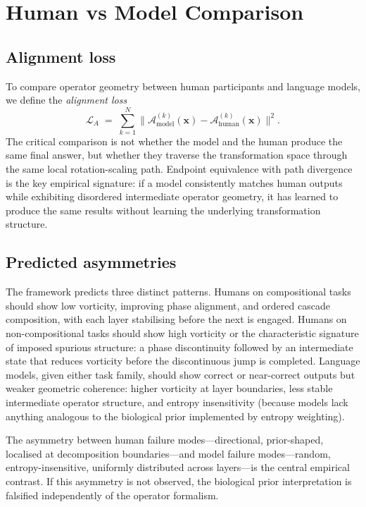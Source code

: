 \documentclass[12pt, a4paper]{article}
\theoremstyle{remark}
\theoremstyle{definition}
\newcommand{\A}{\mathcal{A}}
\begin{document}
\section{Human vs Model Comparison}
\label{sec:comparison}

\subsection{Alignment loss}

To compare operator geometry between human participants and language models, we define the
\emph{alignment loss}
\begin{equation}
  \mathcal{L}_A \;=\; \sum_{k=1}^{N}
  \bigl\|\A^{(k)}_{\text{model}}(\mathbf{x}) -
         \A^{(k)}_{\text{human}}(\mathbf{x})\bigr\|^2.
  \label{eq:alignloss}
\end{equation}
The critical comparison is not whether the model and the human produce the same final
answer, but whether they traverse the transformation space through the same local
rotation-scaling path.  Endpoint equivalence with path divergence is the key empirical
signature: if a model consistently matches human outputs while exhibiting disordered
intermediate operator geometry, it has learned to produce the same results without learning
the underlying transformation structure.

\subsection{Predicted asymmetries}

The framework predicts three distinct patterns.  Humans on compositional tasks should show
low vorticity, improving phase alignment, and ordered cascade composition, with each layer
stabilising before the next is engaged.  Humans on non-compositional tasks should show
high vorticity or the characteristic signature of imposed spurious structure: a phase
discontinuity followed by an intermediate state that reduces vorticity before the
discontinuous jump is completed.  Language models, given either task family, should show
correct or near-correct outputs but weaker geometric coherence: higher vorticity at layer
boundaries, less stable intermediate operator structure, and entropy insensitivity (because
models lack anything analogous to the biological prior implemented by entropy weighting).

The asymmetry between human failure modes---directional, prior-shaped, localised at
decomposition boundaries---and model failure modes---random, entropy-insensitive, uniformly
distributed across layers---is the central empirical contrast.  If this asymmetry is not
observed, the biological prior interpretation is falsified independently of the operator
formalism.
\end{document}
